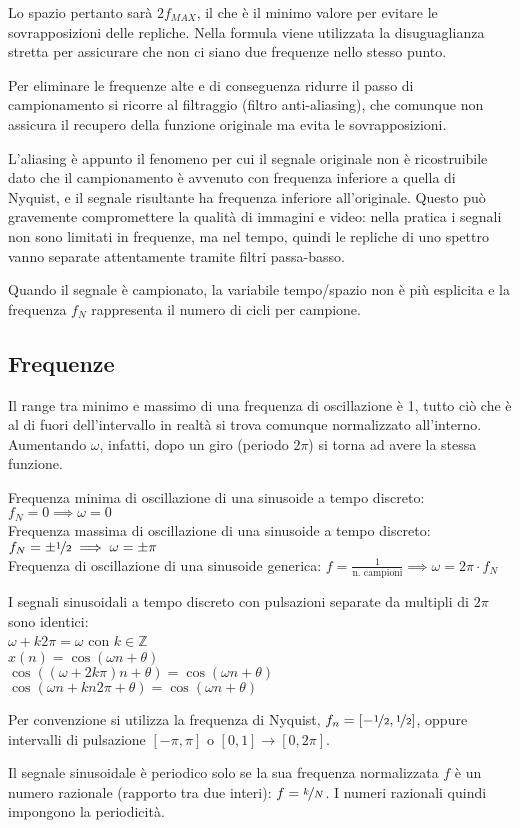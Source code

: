 Lo spazio pertanto sarà $2f_{MAX}$, il che è il minimo valore per evitare le sovrapposizioni delle repliche. Nella formula viene utilizzata la disuguaglianza stretta per assicurare che non ci siano due frequenze nello stesso punto.

Per eliminare le frequenze alte e di conseguenza ridurre il passo di campionamento si ricorre al filtraggio (filtro anti-aliasing), che comunque non assicura il recupero della funzione originale ma evita le sovrapposizioni.

L'aliasing è appunto il fenomeno per cui il segnale originale non è ricostruibile dato che il campionamento è avvenuto con frequenza inferiore a quella di Nyquist, e il segnale risultante ha frequenza inferiore all'originale. Questo può gravemente compromettere la qualità di immagini e video: nella pratica i segnali non sono limitati in frequenze, ma nel tempo, quindi le repliche di uno spettro vanno separate attentamente tramite filtri passa-basso.

Quando il segnale è campionato, la variabile tempo/spazio non è più esplicita e la frequenza $f_N$ rappresenta il numero di cicli per campione.

\subsection{Frequenze}
Il range tra minimo e massimo di una frequenza di oscillazione è 1, tutto ciò che è al di fuori dell'intervallo in realtà si trova comunque normalizzato all'interno. Aumentando $\omega$, infatti, dopo un giro (periodo $2\pi$) si torna ad avere la stessa funzione. 

Frequenza minima di oscillazione di una sinusoide a tempo discreto: $f_N = 0 \implies \omega = 0$ \\
Frequenza massima di oscillazione di una sinusoide a tempo discreto: $f_N = \pm \nicefrac{1}{2} \implies \omega = \pm \pi$ \\
Frequenza di oscillazione di una sinusoide generica: $f = \frac{1}{\text{n. campioni}} \implies \omega = 2\pi \cdot f_N$

I segnali sinusoidali a tempo discreto con pulsazioni separate da multipli di $2\pi$ sono identici: \\
$\omega + k2\pi = \omega$ con $k \in \mathbb{Z}$ \\
$x(n) = \cos(\omega n + \theta)$ \\
$\cos((\omega + 2k\pi)n + \theta) = \cos(\omega n + \theta)$ \\
$\cos(\omega n + kn2\pi + \theta) = \cos(\omega n + \theta)$

Per convenzione si utilizza la frequenza di Nyquist, $f_n = [-\nicefrac{1}{2}, \nicefrac{1}{2}]$, oppure intervalli di pulsazione $[-\pi, \pi]$ o $[0, 1] \rightarrow [0, 2\pi]$.

Il segnale sinusoidale è periodico solo se la sua frequenza normalizzata $f$ è un numero razionale (rapporto tra due interi): $f = \nicefrac{k}{N}$. I numeri razionali quindi impongono la periodicità. 
